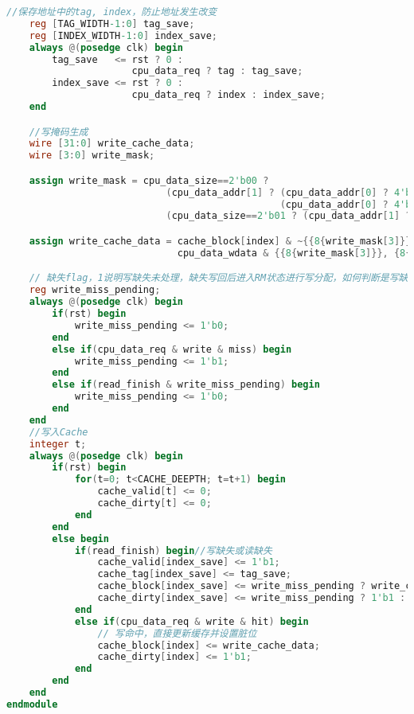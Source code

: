 \begin{lstlisting}[language=Verilog,frame=single]
    //保存地址中的tag, index，防止地址发生改变
    reg [TAG_WIDTH-1:0] tag_save;
    reg [INDEX_WIDTH-1:0] index_save;
    always @(posedge clk) begin
        tag_save   <= rst ? 0 :
                      cpu_data_req ? tag : tag_save;
        index_save <= rst ? 0 :
                      cpu_data_req ? index : index_save;
    end

    //写掩码生成
    wire [31:0] write_cache_data;
    wire [3:0] write_mask;

    assign write_mask = cpu_data_size==2'b00 ?
                            (cpu_data_addr[1] ? (cpu_data_addr[0] ? 4'b1000 : 4'b0100):
                                                (cpu_data_addr[0] ? 4'b0010 : 4'b0001)) :
                            (cpu_data_size==2'b01 ? (cpu_data_addr[1] ? 4'b1100 : 4'b0011) : 4'b1111);

    assign write_cache_data = cache_block[index] & ~{{8{write_mask[3]}}, {8{write_mask[2]}}, {8{write_mask[1]}}, {8{write_mask[0]}}} | 
                              cpu_data_wdata & {{8{write_mask[3]}}, {8{write_mask[2]}}, {8{write_mask[1]}}, {8{write_mask[0]}}};

    // 缺失flag，1说明写缺失未处理，缺失写回后进入RM状态进行写分配，如何判断是写缺失还是读缺失
    reg write_miss_pending;
    always @(posedge clk) begin
        if(rst) begin
            write_miss_pending <= 1'b0;
        end
        else if(cpu_data_req & write & miss) begin
            write_miss_pending <= 1'b1;
        end
        else if(read_finish & write_miss_pending) begin
            write_miss_pending <= 1'b0;
        end
    end
    //写入Cache
    integer t;
    always @(posedge clk) begin
        if(rst) begin
            for(t=0; t<CACHE_DEEPTH; t=t+1) begin
                cache_valid[t] <= 0;
                cache_dirty[t] <= 0;
            end
        end
        else begin
            if(read_finish) begin//写缺失或读缺失
                cache_valid[index_save] <= 1'b1;
                cache_tag[index_save] <= tag_save;
                cache_block[index_save] <= write_miss_pending ? write_cache_data : cache_data_rdata;
                cache_dirty[index_save] <= write_miss_pending ? 1'b1 : 1'b0;
            end
            else if(cpu_data_req & write & hit) begin
                // 写命中，直接更新缓存并设置脏位
                cache_block[index] <= write_cache_data;
                cache_dirty[index] <= 1'b1;
            end
        end
    end
endmodule
\end{lstlisting}